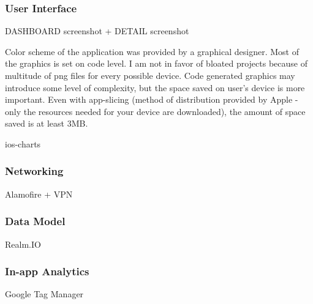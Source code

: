 \subsubsection*{User Interface}

DASHBOARD screenshot + DETAIL screenshot

Color scheme of the application was provided by a graphical designer. Most of the graphics is set on code level. I am not in favor of bloated projects because of multitude of png files for every possible device. Code generated graphics may introduce some level of complexity, but the space saved on user's device is more important. Even with app-slicing (method of distribution provided by Apple - only the resources needed for your device are downloaded), the amount of space saved is at least 3MB.

ios-charts

\subsubsection*{Networking}

Alamofire + VPN

\subsubsection*{Data Model}

Realm.IO

\subsubsection*{In-app Analytics}

Google Tag Manager